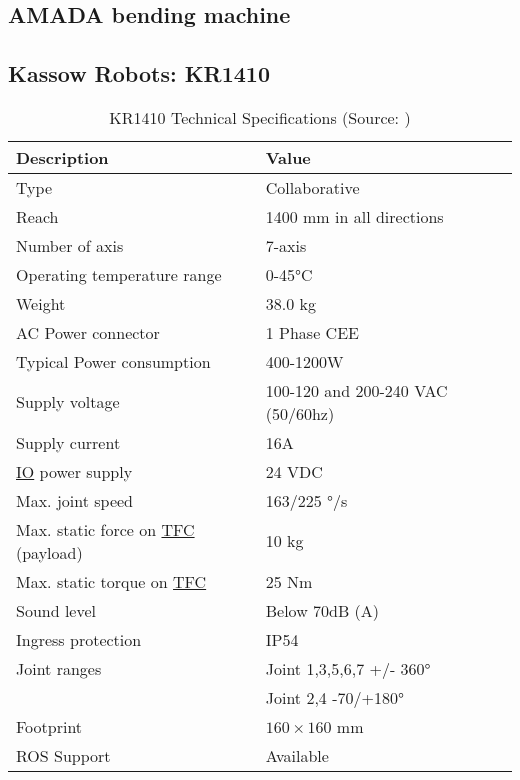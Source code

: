 \subsection{AMADA bending machine}


\subsection{Kassow Robots: KR1410}

\begin{table}[h!]
    \centering
    \begin{tabular}{ll}
        \textbf{Description} & \textbf{Value} \\ \hline
        Type & Collaborative \\
        Reach & 1400 mm in all directions\\
        Number of axis & 7-axis \\
        Operating temperature range & 0-45°C\\ 
        Weight & 38.0 kg \\ 
        AC Power connector & 1 Phase CEE \\ 
        Typical Power consumption & 400-1200W \\ 
        Supply voltage & 100-120 and 200-240 VAC (50/60hz) \\ 
        Supply current & 16A\\ 
        \hyperref[acro:IO]{IO} power supply & 24 VDC\\ 
        Max. joint speed  & 163/225 °/s\\ 
        Max. static force on \hyperref[acro:TFC]{TFC} (payload) & 10 kg\\ 
        Max. static torque on \hyperref[acro:TFC]{TFC} & 25 Nm\\ 
        Sound level & Below 70dB (A) \\ 
        Ingress protection & IP54 \\ 
        Joint ranges & Joint 1,3,5,6,7 +/- 360° \\
        & Joint 2,4 -70/+180° \\ 
        Footprint& $160 \times 160$ mm \\ 
        ROS Support & Available \\ \hline
    \end{tabular}
    \caption{KR1410 Technical Specifications (Source: \cite[page 31]{kassow-specification})}
    \end{table}

